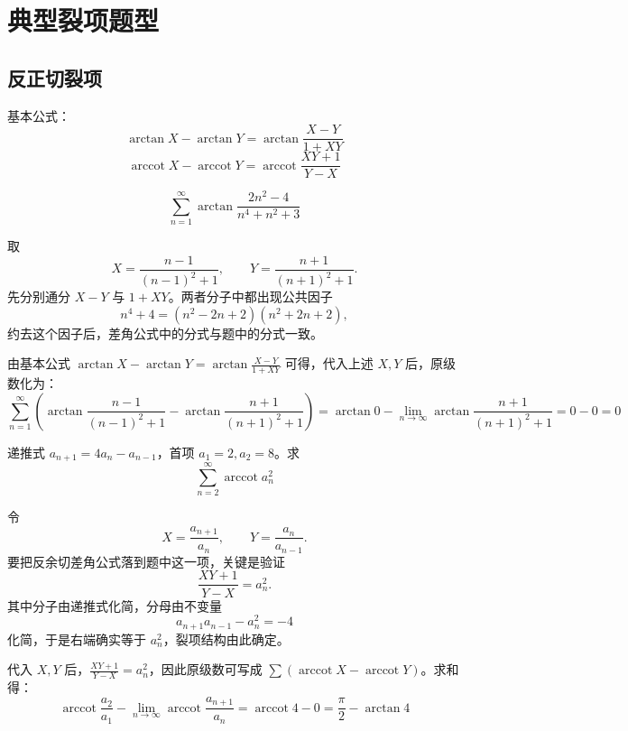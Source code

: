 \chapter{典型裂项题型}

\section{反正切裂项}

基本公式：$$ \arctan X - \arctan Y = \arctan \frac{X-Y}{1+XY} $$$$ \operatorname{arccot} X - \operatorname{arccot} Y = \operatorname{arccot} \frac{XY+1}{Y-X} $$

\begin{example}
    \[\sum_{n=1}^{\infty} \arctan \frac{2n^2-4}{n^4+n^2+3}\]
\end{example}
\begin{solution}
取
\[
X = \frac{n-1}{(n-1)^2+1},\qquad Y = \frac{n+1}{(n+1)^2+1}.
\]
先分别通分 \(X-Y\) 与 \(1+XY\)。两者分子中都出现公共因子
\[
n^4+4=(n^2-2n+2)(n^2+2n+2),
\]
约去这个因子后，差角公式中的分式与题中的分式一致。

由基本公式 \(\arctan X - \arctan Y = \arctan \frac{X-Y}{1+XY}\) 可得，代入上述 \(X,Y\) 后，原级数化为：
\[
\sum_{n=1}^{\infty} \left( \arctan \frac{n-1}{(n-1)^2+1} - \arctan \frac{n+1}{(n+1)^2+1} \right) = \arctan 0 - \lim_{n\to\infty} \arctan \frac{n+1}{(n+1)^2+1} = 0 - 0 = 0
\]

\end{solution}

\begin{example}
    递推式 \( a_{n+1} = 4a_n - a_{n-1} \)，首项 \( a_1=2, a_2=8 \)。求
    \[\sum_{n=2}^{\infty} \operatorname{arccot} a_n^2\]
\end{example}
\begin{solution}
令
\[
X = \frac{a_{n+1}}{a_n},\qquad Y = \frac{a_n}{a_{n-1}}.
\]
要把反余切差角公式落到题中这一项，关键是验证
\[
\frac{XY+1}{Y-X}=a_n^2.
\]
其中分子由递推式化简，分母由不变量
\[
a_{n+1}a_{n-1}-a_n^2=-4
\]
化简，于是右端确实等于 \(a_n^2\)，裂项结构由此确定。

代入 \( X,Y \) 后，\(\frac{XY+1}{Y-X} = a_n^2\)，因此原级数可写成 \(\sum (\operatorname{arccot} X - \operatorname{arccot} Y)\)。求和得：
\[
\operatorname{arccot} \frac{a_2}{a_1} - \lim_{n\to\infty} \operatorname{arccot} \frac{a_{n+1}}{a_n} = \operatorname{arccot} 4 - 0 = \frac{\pi}{2} - \arctan 4
\]

\end{solution}

